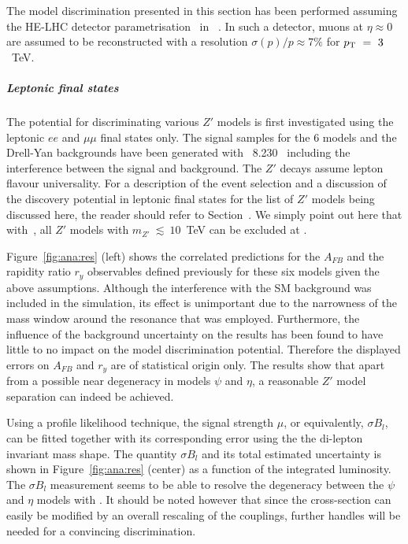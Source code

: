 The model discrimination presented in this section has been performed assuming the HE-LHC detector parametrisation~\cite{hlhelhc_web} in \delphes~\cite{deFavereau:2013fsa}. In such a detector, muons at $\eta \approx 0$ are assumed to be reconstructed with a resolution $\sigma(p)/p \approx 7\%$ for $p_\text{T}~=~3 $~TeV.

\subparagraph*{Leptonic final states}
\label{par:lepana}

The potential for discriminating various $Z'$ models is first investigated using the leptonic $ee$ and $\mu\mu$ final states only. The signal samples for the 6 models and the Drell-Yan backgrounds have been generated with \pythia~8.230~\cite{Sjostrand:2014zea} including the interference between the signal and background. The $Z'$ decays assume lepton flavour universality. For a description of the event selection and a discussion of the discovery potential in leptonic final states for the list of $Z'$ models being discussed here, the reader should refer to Section~\cite{subsubsec:hr_lep}. We simply point out here that with \intlumihelhc\,, all $Z'$ models with $m_{Z'}~\lesssim~10$~TeV can be excluded at \sqrtshelhc.

Figure~\ref{fig:ana:res} (left) shows the correlated predictions for the $A_{FB}$ and the rapidity ratio $r_y$ observables defined previously for these six models given the above assumptions. Although the interference with the SM background was included in the simulation, its effect is unimportant due to the narrowness of the mass window around the resonance that was employed. Furthermore, the influence of the background uncertainty on the results has been found to have little to no impact on the model discrimination potential. Therefore the displayed errors on $A_{FB}$ and $r_y$ are of statistical origin only. The results show that apart from a possible near degeneracy in models $\psi$ and $\eta$, a reasonable $Z'$ model separation can indeed be achieved.

Using a profile likelihood technique, the signal strength $\mu$, or equivalently, $\sigma B_l$, can be fitted together with its corresponding error using the the di-lepton invariant mass shape. The quantity $\sigma B_l$ and its total estimated uncertainty is shown in Figure~\ref{fig:ana:res} (center) as a function of the integrated luminosity. The $\sigma B_l$ measurement seems to be able to resolve the degeneracy between the $\psi$ and $\eta$ models with \intlumihelhc. It should be noted however that since the cross-section can easily be modified by an overall rescaling of the couplings, further handles will be needed for a convincing discrimination.

